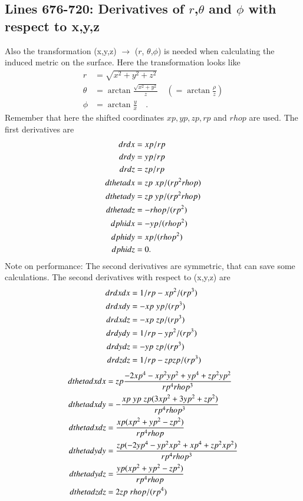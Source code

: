 \documentclass[11pt,a4paper,twoside]{article}
\begin{document}
\subsection{Lines 676-720: Derivatives of $r$,$\theta$ and $\phi$ with 
respect to x,y,z}
Also the transformation  (x,y,z) $\rightarrow$ ($r$, $\theta$,$\phi$) is 
needed when calculating
the induced metric on the surface. Here the transformation looks like
\begin{align}
  r&=\sqrt{x^2+y^2+z^2}\\
  \theta&=\arctan \frac {\sqrt {x^2+y^2}} z  \quad(= \arctan \frac \rho z)\\
  \phi&=\arctan \frac y x\quad.
\end{align}
Remember that here the shifted coordinates $xp, yp, zp, rp$ and $rhop$
are used. The first derivatives are
\begin{align}
  drdx &= xp/rp  \notag\\
  drdy &= yp/rp  \notag\\
  drdz &= zp/rp  \\
  dthetadx &= zp\; xp/(rp^2 rhop)  \notag\\
  dthetady &= zp\; yp/(rp^2 rhop)  \notag\\
  dthetadz &= -rhop/(rp^2)       \\
  dphidx &= -yp/(rhop^2)   \notag\\
  dphidy &= xp/(rhop^2)    \notag\\
  dphidz &= 0 .
\end{align}
Note on performance: The second derivatives are symmetric, that
can save some calculations.
The second derivatives with respect to (x,y,z) are
\begin{align}
  drdxdx &= 1/rp - xp^2/(rp^3) \notag\\
  drdxdy &= - xp \;yp/(rp^3)      \notag\\
  drdxdz &= - xp \;zp/(rp^3)      \\
  drdydy &= 1/rp - yp^2/(rp^3) \notag\\
  drdydz &= - yp \;zp/(rp^3)      \notag\\
  drdzdz &= 1/rp - zp zp/(rp^3)
\end{align}
\begin{align}
  dthetadxdx &= zp \frac{-2 xp^4-xp^2 yp^2+yp^4+zp^2 yp^2} {rp^4 rhop^3} \notag\\
  dthetadxdy &= - \frac{xp\; yp\; zp (3 xp^2+3 yp^2+zp^2)}{ rp^4 rhop^3}     \notag\\
  dthetadxdz &= \frac {xp (xp^2+yp^2-zp^2)} {rp^4 rhop}               \\
  dthetadydy &= \frac {zp (-2 yp^4-yp^2 xp^2+xp^4+zp^2 xp^2)} {rp^4 rhop^3}  \notag\\
  dthetadydz &= \frac {yp (xp^2+yp^2-zp^2)}{rp^4 rhop}                       \notag\\
  dthetadzdz &= 2 zp\; rhop/(rp^4)
\end{align}
\end{document}
